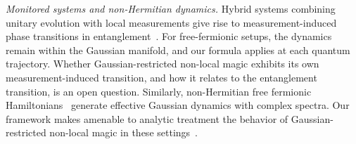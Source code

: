\documentclass[aps,prl,twocolumn,superscriptaddress,reprint,longbibliography,nofootinbib]{revtex4-2}
\begin{document}
\emph{Monitored systems and non-Hermitian dynamics.}
Hybrid systems combining unitary evolution with local measurements give rise to measurement-induced phase transitions in entanglement~\cite{FisherRandom2023,Li_2025,oshima}.
For free-fermionic setups, the dynamics remain within the Gaussian manifold, and our formula applies at each quantum trajectory.
Whether Gaussian-restricted non-local magic exhibits its own measurement-induced transition, and how it relates to the entanglement transition, is an open question.
Similarly, non-Hermitian free fermionic Hamiltonians~\cite{Ashida_2020,kawabata2026nonhermitiandisorderedsystems} generate effective Gaussian dynamics with complex spectra.
Our framework makes amenable to analytic treatment the behavior of Gaussian-restricted non-local magic in these settings~\cite{schirooooo,gallo,granet,lapierre2025entanglementtransitionsstructuredrandom}.

\end{document}
